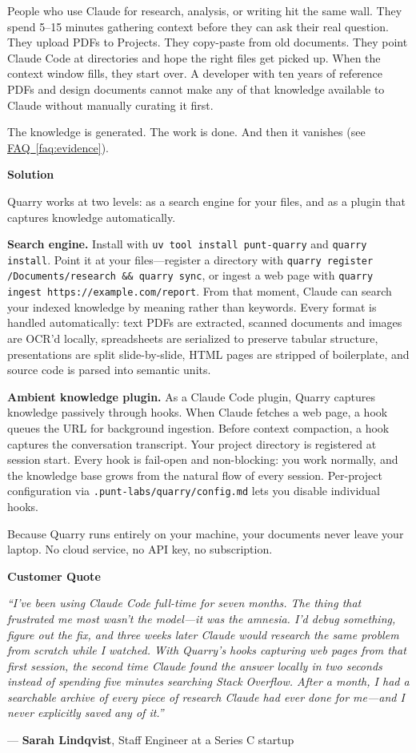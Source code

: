 \documentclass[11pt,letterpaper]{article}
\newcommand{\prsection}[1]{%
  \vspace{1em}%
  {\large\bfseries\color{SectionBlue}#1}%
  \vspace{0.3em}\par%
}
\newcommand{\faqref}[1]{\hyperref[#1]{FAQ~\ref*{#1}}}
\begin{document}
People who use Claude for research, analysis, or writing hit the same wall.
They spend 5--15 minutes gathering context before they can ask their real
question. They upload PDFs to Projects. They copy-paste from old documents.
They point Claude Code at directories and hope the right files get picked up.
When the context window fills, they start over. A developer with ten years of
reference PDFs and design documents cannot make any of that knowledge available
to Claude without manually curating it first.

The knowledge is generated. The work is done. And then it vanishes
(see \faqref{faq:evidence}).

\prsection{Solution}

Quarry works at two levels: as a search engine for your files, and as a plugin
that captures knowledge automatically.

\textbf{Search engine.} Install with \texttt{uv tool install punt-quarry} and
\texttt{quarry install}. Point it at your files---register a directory with
\texttt{quarry register \texttildelow/Documents/research \&\& quarry sync}, or
ingest a web page with \texttt{quarry ingest https://example.com/report}. From
that moment,
Claude can search your indexed knowledge by meaning rather than keywords. Every
format is handled automatically: text PDFs are extracted, scanned documents and
images are OCR'd locally, spreadsheets are serialized to preserve tabular
structure, presentations are split slide-by-slide, HTML pages are stripped of
boilerplate, and source code is parsed into semantic units.

\textbf{Ambient knowledge plugin.} As a Claude Code plugin, Quarry captures
knowledge passively through hooks. When Claude fetches a web page, a hook
queues the URL for background ingestion. Before context compaction, a hook
captures the conversation transcript. Your project directory is registered at
session start. Every hook is fail-open and non-blocking: you work normally, and
the knowledge base grows from the natural flow of every session. Per-project
configuration via \texttt{.punt-labs/quarry/config.md} lets you disable
individual hooks.

Because Quarry runs entirely on your machine, your documents never leave your
laptop. No cloud service, no API key, no subscription.

\prsection{Customer Quote}

\begin{customerquote}
\textit{``I've been using Claude Code full-time for seven months. The thing
that frustrated me most wasn't the model---it was the amnesia. I'd debug
something, figure out the fix, and three weeks later Claude would research the
same problem from scratch while I watched. With Quarry's hooks capturing web
pages from that first session, the second time Claude found the answer locally
in two seconds instead of spending five minutes searching Stack Overflow. After
a month, I had a searchable archive of every piece of research Claude had ever
done for me---and I never explicitly saved any of it.''}

\raggedleft --- \textbf{Sarah Lindqvist}, Staff Engineer at a Series C startup
\end{customerquote}
\end{document}
